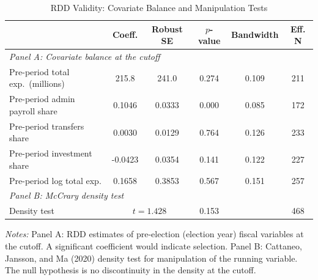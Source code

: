 \begin{table}[htbp]
\centering
\begin{threeparttable}
\caption{RDD Validity: Covariate Balance and Manipulation Tests}
\label{tab:balance}
\begin{tabular}{lccccc}
\toprule
 & Coeff. & Robust SE & $p$-value & Bandwidth & Eff. N \\
\midrule
\multicolumn{6}{l}{\textit{Panel A: Covariate balance at the cutoff}} \\
Pre-period total exp.\ (millions) & 215.8 & 241.0 & 0.274 & 0.109 & 211 \\
Pre-period admin payroll share & 0.1046 & 0.0333 & 0.000 & 0.085 & 172 \\
Pre-period transfers share & 0.0030 & 0.0129 & 0.764 & 0.126 & 233 \\
Pre-period investment share & -0.0423 & 0.0354 & 0.141 & 0.122 & 227 \\
Pre-period log total exp. & 0.1658 & 0.3853 & 0.567 & 0.151 & 257 \\
\midrule
\multicolumn{6}{l}{\textit{Panel B: McCrary density test}} \\
Density test & \multicolumn{2}{c}{$t = 1.428$} & 0.153 & & 468 \\
\bottomrule
\end{tabular}
\begin{tablenotes}[flushleft]
\small
\item \textit{Notes:} Panel A: RDD estimates of pre-election (election year) fiscal variables at the cutoff. A significant coefficient would indicate selection. Panel B: Cattaneo, Jansson, and Ma (2020) density test for manipulation of the running variable. The null hypothesis is no discontinuity in the density at the cutoff.
\end{tablenotes}
\end{threeparttable}
\end{table}
